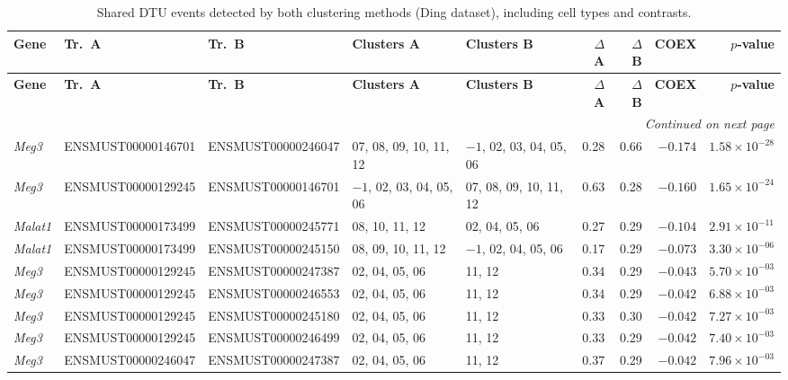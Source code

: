 \begin{landscape}
\begingroup
\setlength{\tabcolsep}{3.5pt}
\begin{longtable}{@{} l l l p{2.8cm} p{2.8cm} r r r r @{}}
\caption{Shared DTU events detected by both clustering methods (Ding dataset), including cell types and contrasts.\label{tab:shared_landscape}}\\
\toprule
\textbf{Gene} & \textbf{Tr.~A} & \textbf{Tr.~B} & \textbf{Clusters A} & \textbf{Clusters B} & \textbf{$\Delta$ A} & \textbf{$\Delta$ B} & \textbf{COEX} & \textbf{$p$-value} \\
\midrule
\endfirsthead
\toprule
\textbf{Gene} & \textbf{Tr.~A} & \textbf{Tr.~B} & \textbf{Clusters A} & \textbf{Clusters B} & \textbf{$\Delta$ A} & \textbf{$\Delta$ B} & \textbf{COEX} & \textbf{$p$-value} \\
\midrule
\endhead
\midrule
\multicolumn{9}{r}{\textit{Continued on next page}} \\
\endfoot
\bottomrule
\endlastfoot
\textit{Meg3}   & ENSMUST00000146701 & ENSMUST00000246047 & 07, 08, 09, 10, 11, 12 & $-1$, 02, 03, 04, 05, 06 & 0.28 & 0.66 & $-0.174$ & $1.58 \times 10^{-28}$ \\
\textit{Meg3}   & ENSMUST00000129245 & ENSMUST00000146701 & $-1$, 02, 03, 04, 05, 06 & 07, 08, 09, 10, 11, 12 & 0.63 & 0.28 & $-0.160$ & $1.65 \times 10^{-24}$ \\
\textit{Malat1} & ENSMUST00000173499 & ENSMUST00000245771 & 08, 10, 11, 12 & 02, 04, 05, 06 & 0.27 & 0.29 & $-0.104$ & $2.91 \times 10^{-11}$ \\
\textit{Malat1} & ENSMUST00000173499 & ENSMUST00000245150 & 08, 09, 10, 11, 12 & $-1$, 02, 04, 05, 06 & 0.17 & 0.29 & $-0.073$ & $3.30 \times 10^{-06}$ \\
\textit{Meg3}   & ENSMUST00000129245 & ENSMUST00000247387 & 02, 04, 05, 06 & 11, 12 & 0.34 & 0.29 & $-0.043$ & $5.70 \times 10^{-03}$ \\
\textit{Meg3}   & ENSMUST00000129245 & ENSMUST00000246553 & 02, 04, 05, 06 & 11, 12 & 0.34 & 0.29 & $-0.042$ & $6.88 \times 10^{-03}$ \\
\textit{Meg3}   & ENSMUST00000129245 & ENSMUST00000245180 & 02, 04, 05, 06 & 11, 12 & 0.33 & 0.30 & $-0.042$ & $7.27 \times 10^{-03}$ \\
\textit{Meg3}   & ENSMUST00000129245 & ENSMUST00000246499 & 02, 04, 05, 06 & 11, 12 & 0.33 & 0.29 & $-0.042$ & $7.40 \times 10^{-03}$ \\
\textit{Meg3}   & ENSMUST00000246047 & ENSMUST00000247387 & 02, 04, 05, 06 & 11, 12 & 0.37 & 0.29 & $-0.042$ & $7.96 \times 10^{-03}$ \\

\end{longtable}
\end{landscape}
